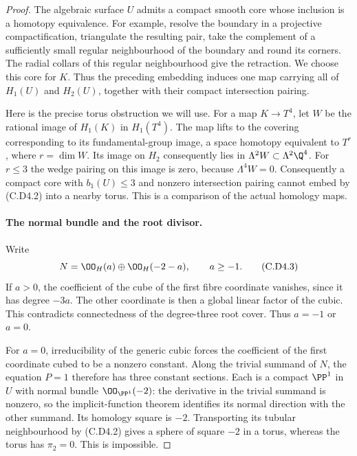 \begin{proof}
The algebraic surface $U$ admits a compact smooth core whose
inclusion is a homotopy equivalence. For example, resolve the
boundary in a projective compactification, triangulate the
resulting pair, take the complement of a sufficiently small
regular neighbourhood of the boundary and round its corners.
The radial collars of this regular neighbourhood give the
retraction. We choose this core for $K$. Thus the preceding
embedding induces one map carrying all of $H_1(U)$ and
$H_2(U)$, together with their compact intersection pairing.

Here is the precise torus obstruction we will use. For a map
$K\to T^4$, let $W$ be the rational image of $H_1(K)$ in
$H_1(T^4)$. The map lifts to the covering corresponding to
its fundamental-group image, a space homotopy equivalent to
$T^r$, where $r=\dim W$. Its image on $H_2$ consequently lies
in $\Lambda^2W\subset\Lambda^2\Q^4$. For $r\le3$ the wedge
pairing on this image is zero, because $\Lambda^4W=0$.
Consequently a compact core with $b_1(U)\le3$ and nonzero
intersection pairing cannot embed by (C.D4.2) into a nearby
torus. This is a comparison of the actual homology maps.

\paragraph{The normal bundle and the root divisor.}
Write
\[
                  N=\OO_H(a)\oplus\OO_H(-2-a),\qquad a\ge-1.
\tag{C.D4.3}
\]
If $a>0$, the coefficient of the cube of the first fibre
coordinate vanishes, since it has degree $-3a$. The other
coordinate is then a global linear factor of the cubic.
This contradicts connectedness of the degree-three root
cover. Thus $a=-1$ or $a=0$.

For $a=0$, irreducibility of the generic cubic forces the
coefficient of the first coordinate cubed to be a nonzero
constant. Along the trivial summand of $N$, the equation
$P=1$ therefore has three constant sections. Each is a
compact $\PP^1$ in $U$ with normal bundle $\OO_{\PP^1}(-2)$:
the derivative in the trivial summand is nonzero, so the
implicit-function theorem identifies its normal direction
with the other summand. Its homology square is $-2$.
Transporting its tubular neighbourhood by (C.D4.2) gives a
sphere of square $-2$ in a torus, whereas the torus has
$\pi_2=0$. This is impossible.


\end{proof}
